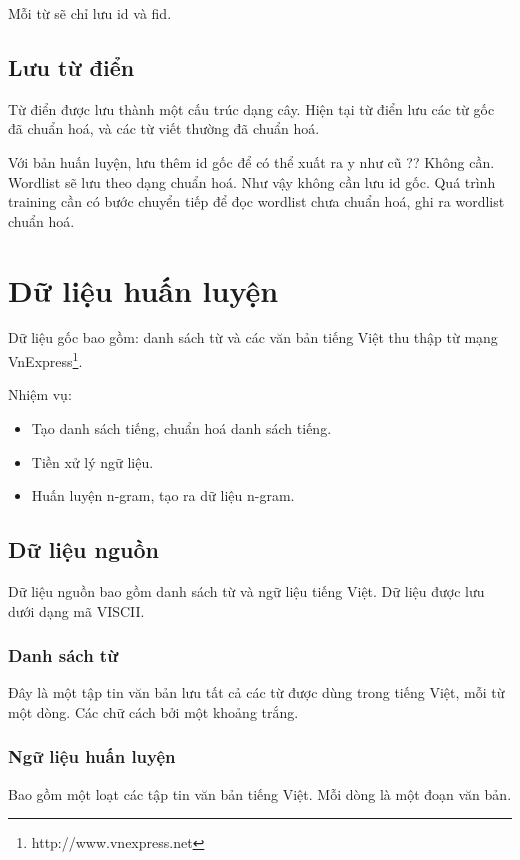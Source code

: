 \documentclass[a4paper,oneside]{book} %
\theoremstyle{break}
\begin{document}
Mỗi từ sẽ chỉ lưu id và fid.

\subsection{Lưu từ điển}

Từ điển được lưu thành một cấu trúc dạng cây. Hiện tại từ điển lưu các
từ gốc đã chuẩn hoá, và các từ viết thường đã chuẩn hoá.

Với bản huấn luyện, lưu thêm id gốc để có thể xuất ra y như cũ ??
Không cần. Wordlist sẽ lưu theo dạng chuẩn hoá. Như vậy không cần lưu
id gốc. Quá trình training cần có bước chuyển tiếp để đọc wordlist
chưa chuẩn hoá, ghi ra wordlist chuẩn hoá.


\section{Dữ liệu huấn luyện}
\label{sec:data-preprocessing}

Dữ liệu gốc bao gồm: danh sách từ và các văn bản tiếng Việt thu thập
từ mạng VnExpress\footnote{http://www.vnexpress.net}.

Nhiệm vụ:
\begin{itemize}
\item Tạo danh sách tiếng, chuẩn hoá danh sách tiếng.
\item Tiền xử lý ngữ liệu.
\item Huấn luyện n-gram, tạo ra dữ liệu n-gram.
\end{itemize}


\subsection{Dữ liệu nguồn}
\label{sec:data-source}

Dữ liệu nguồn bao gồm danh sách từ và ngữ liệu tiếng Việt. Dữ liệu
được lưu dưới dạng mã VISCII. 
\subsubsection{Danh sách từ}

Đây là một tập tin văn bản lưu tất cả các từ được dùng trong tiếng
Việt, mỗi từ một dòng. Các chữ cách bởi một khoảng trắng.


\subsubsection{Ngữ liệu huấn luyện}

Bao gồm một loạt các tập tin văn bản tiếng Việt. Mỗi dòng là một đoạn
văn bản.
\end{document}
